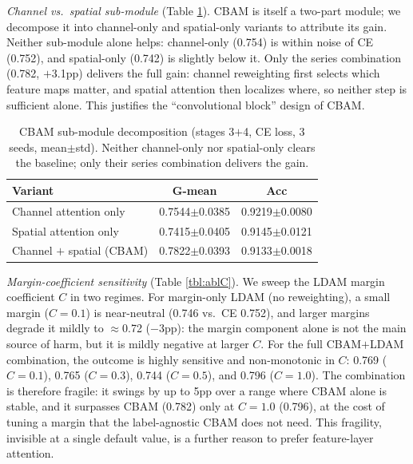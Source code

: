 \documentclass[a4paper,fleqn]{cas-sc}
\begin{document}
\begin{sloppypar}
	\par{
		\emph{Channel vs.\ spatial sub-module} (Table \ref{tbl:ablsub}). CBAM is itself a two-part module; we decompose it into channel-only and spatial-only variants to attribute its gain. Neither sub-module alone helps: channel-only (0.754) is within noise of CE (0.752), and spatial-only (0.742) is slightly below it. Only the series combination (0.782, $+$3.1pp) delivers the full gain: channel reweighting first selects which feature maps matter, and spatial attention then localizes where, so neither step is sufficient alone. This justifies the ``convolutional block'' design of CBAM.
	}

	\begin{table}[pos=htbp]
		\footnotesize
		\caption{CBAM sub-module decomposition (stages 3$+$4, CE loss, 3 seeds, mean$\pm$std). Neither channel-only nor spatial-only clears the baseline; only their series combination delivers the gain.}
		\label{tbl:ablsub}
		\centering
		\begin{tabular}{lcc}
			\hline
			\textbf{Variant} & \textbf{G-mean} & \textbf{Acc} \\ \hline
			Channel attention only & 0.7544$\pm$0.0385 & 0.9219$\pm$0.0080 \\
			Spatial attention only & 0.7415$\pm$0.0405 & 0.9145$\pm$0.0121 \\
			Channel $+$ spatial (CBAM) & 0.7822$\pm$0.0393 & 0.9133$\pm$0.0018 \\ \hline
		\end{tabular}
	\end{table}

	\par{
		\emph{Margin-coefficient sensitivity} (Table \ref{tbl:ablC}). We sweep the LDAM margin coefficient $C$ in two regimes. For margin-only LDAM (no reweighting), a small margin ($C=0.1$) is near-neutral (0.746 vs.\ CE 0.752), and larger margins degrade it mildly to $\approx$0.72 ($-$3pp): the margin component alone is not the main source of harm, but it is mildly negative at larger $C$. For the full CBAM$+$LDAM combination, the outcome is highly sensitive and non-monotonic in $C$: 0.769 ($C=0.1$), 0.765 ($C=0.3$), 0.744 ($C=0.5$), and 0.796 ($C=1.0$). The combination is therefore fragile: it swings by up to 5pp over a range where CBAM alone is stable, and it surpasses CBAM (0.782) only at $C=1.0$ (0.796), at the cost of tuning a margin that the label-agnostic CBAM does not need. This fragility, invisible at a single default value, is a further reason to prefer feature-layer attention.
	}


\end{sloppypar}
\end{document}
